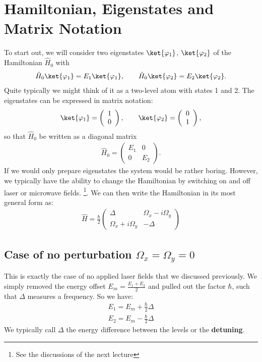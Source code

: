 \section{Hamiltonian, Eigenstates and Matrix Notation}

To start out, we will consider two eigenstates $\ket{\varphi_1}$, $\ket{\varphi_2}$ of the Hamiltonian $\hat{H}_0$ with
\begin{align}
 \hat{H}_0\ket{\varphi_1}=E_1\ket{\varphi_1}, \qquad \hat{H}_0\ket{\varphi_2}=E_2\ket{\varphi_2}.
\end{align}
Quite typically we might think of it as a two-level atom with states 1 and 2. The eigenstates can be expressed in matrix notation:
\begin{align}
 \ket{\varphi_1}=\left( \begin{array}{c} 1 \\ 0 \end{array} \right), \qquad \ket{\varphi_2}=\left( \begin{array}{c} 0 \\ 1 \end{array} \right),
\end{align}
so that $\hat{H}_0$ be written as a diagonal matrix
\begin{align}
    \hat{H}_0 = \left(\begin{array}{cc} E_1 & 0 \\ 0 & E_2 \end{array}\right).
\end{align}
If we would only prepare eigenstates the system would be rather boring. However, we typically have the ability to change the Hamiltonian by switching on and off laser or microwave fields. \footnote{See the discussions of the next lecture}. We can then write the Hamiltonian in its most general form as:
\begin{align}
\hat{H} = \frac{\hbar}{2}\left( \begin{array}{cc} \Delta  & \Omega_x - i\Omega_y\\ \Omega_x +i\Omega_y & -\Delta \end{array} \right)
\end{align}

\subsection{Case of no perturbation $\Omega_x = \Omega_y = 0$}

This is exactly the case of no applied laser fields that we discussed previously. We simply removed the energy offset $E_m = \frac{E_1+E_2}{2}$ and pulled out the factor $\hbar$, such that $\Delta$ measures a frequency. So we have:
\begin{align}
E_1 = E_m+ \frac{\hbar}{2}\Delta\\
E_2 = E_m- \frac{\hbar}{2}\Delta
\end{align}
We typically call $\Delta$ the energy difference between the levels or the \textbf{detuning}.

